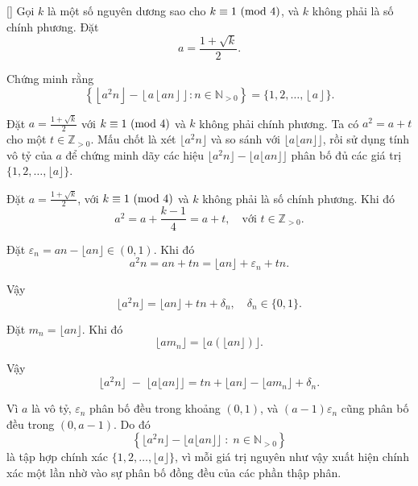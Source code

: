 \documentclass[../03-arithmetic-functions.tex]{subfiles}
\begin{document}
\begin{example*}\label{example:ROU-2015-TST-D1-P4}[\textbf{}]
    Gọi \( k \) là một số nguyên dương sao cho \( k \equiv 1 \ (\mathrm{mod}\ 4) \), và \( k \) không phải là số chính phương. Đặt
    \[
        a = \frac{1 + \sqrt{k}}{2}.
    \]
    
    Chứng minh rằng
    \[
        \left\{ \left\lfloor a^2 n \right\rfloor - \left\lfloor a \left\lfloor a n \right\rfloor \right\rfloor : n \in \mathbb{N}_{>0} \right\} = \{ 1, 2, \ldots, \left\lfloor a \right\rfloor \}.
    \]
\end{example*}

\begin{story*}
    Đặt \(a = \tfrac{1 + \sqrt{k}}{2}\) với \(k \equiv 1 \ (\mathrm{mod}\ 4)\) và \(k\) không phải chính phương. Ta có \(a^2 = a + t\) cho một \(t \in \mathbb{Z}_{>0}\). Mấu chốt là xét \(\lfloor a^2 n \rfloor\) và so sánh với \(\lfloor a \lfloor a n \rfloor \rfloor\), rồi sử dụng tính vô tỷ của \(a\) để chứng minh dãy các hiệu \(\lfloor a^2 n \rfloor - \lfloor a \lfloor a n \rfloor\rfloor\) phân bố đủ các giá trị \(\{1,2,\dots,\lfloor a\rfloor\}\).
\end{story*}

\bigbreak

\begin{soln}
    Đặt \( a = \frac{1 + \sqrt{k}}{2} \), với \( k \equiv 1 \ (\mathrm{mod}\ 4) \) và \( k \) không phải là số chính phương. Khi đó
    \[
        a^2 = a + \frac{k - 1}{4} = a + t, \quad \text{với } t \in \mathbb{Z}_{>0}.
    \]
    
    Đặt \( \varepsilon_n = a n - \lfloor a n \rfloor \in (0,1) \). Khi đó
    \[
        a^2 n = a n + t n = \lfloor a n \rfloor + \varepsilon_n + t n.
    \]
    
    Vậy
    \[
        \lfloor a^2 n \rfloor = \lfloor a n \rfloor + t n + \delta_n, \quad \delta_n \in \{0,1\}.
    \]

    Đặt \( m_n = \lfloor a n \rfloor \). Khi đó
    \[
        \lfloor a m_n \rfloor = \lfloor a (\lfloor a n \rfloor) \rfloor.
    \]
    
    Vậy
    \[
        \lfloor a^2 n \rfloor \;-\; \lfloor a \lfloor a n \rfloor \rfloor 
        = t n + \lfloor a n \rfloor - \lfloor a m_n \rfloor + \delta_n.
    \]
    
    Vì \( a \) là vô tỷ, \( \varepsilon_n \) phân bố đều trong khoảng \( (0,1) \), và \((a - 1)\varepsilon_n\) cũng phân bố đều trong \( (0, a - 1) \).  
    Do đó
    \[
        \left\{ 
            \lfloor a^2 n \rfloor - \lfloor a \lfloor a n \rfloor \rfloor 
            \;:\; n \in \mathbb{N}_{>0} 
        \right\}
    \]
    là tập hợp chính xác \(\{1, 2, \ldots, \lfloor a \rfloor\}\), vì mỗi giá trị nguyên như vậy xuất hiện chính xác một lần nhờ vào sự phân bố đồng đều của các phần thập phân.
\end{soln}
\end{document}
